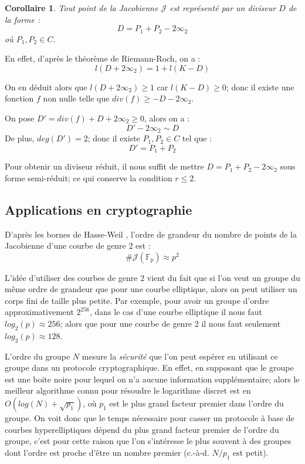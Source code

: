\documentclass[a4paper]{article}
\newtheorem{corollaire}[theoreme]{Corollaire}
\theoremstyle{definition}
\theoremstyle{remark}
\numberwithin{equation}{section}
\begin{document}
\begin{corollaire}
\label{div_red}
Tout point de la Jacobienne $\mathcal{J}$ est représenté par un diviseur $D$ de la forme :
$$D = P_1 + P_2 - 2\infty_2$$
où $P_1,P_2 \in C$.
\end{corollaire}

En effet, d'après le théorème de Riemann-Roch, on a :
$$l(D+2\infty_2) = 1 + l(K-D)$$

On en déduit alors que $l(D+2\infty_2) \geq 1$ car $l(K-D) \geq 0$; donc il existe une fonction $f$ non nulle telle que $div(f) \geq -D - 2\infty_2$.

On pose $D' = div(f) + D + 2\infty_2 \geq 0$, alors on a :
$$D' - 2\infty_2 \sim D$$
De plus, $deg(D') = 2$; donc il existe $P_1, P_2 \in C$ tel que :
$$D' = P_1 + P_2$$

Pour obtenir un diviseur réduit, il nous suffit de mettre $D = P_1 + P_2 - 2\infty_2$ sous forme semi-réduit; ce qui conserve la condition $r \leq 2$.

\subsection{Applications en cryptographie}
D'après les bornes de Hasse-Weil \citep{weil}, l'ordre de grandeur du nombre de points de la Jacobienne d'une courbe de genre 2 est :
$$\#\mathcal{J}(\mathbb{F}_p) \approx p^2$$

L'idée d'utiliser des courbes de genre $2$ vient du fait que si l'on veut un groupe du même ordre de grandeur que pour une courbe elliptique, alors on peut utiliser un corps fini de taille plus petite. Par exemple, pour avoir un groupe d'ordre approximativement $2^{256}$, dans le cas d'une courbe elliptique il nous faut $log_2(p) \approx 256$; alors que pour une courbe de genre 2 il nous faut seulement $log_2(p) \approx 128$.

L'ordre du groupe $N$ mesure la \emph{sécurité} que l'on peut espérer en utilisant ce groupe dans un protocole cryptographique. En effet, en supposant que le groupe est une boite noire pour lequel on n'a aucune information supplémentaire; alors le meilleur algorithme connu pour résoudre le logarithme discret est en $O(log(N)+\sqrt{p_1})$, où $p_1$ est le plus grand facteur premier dans l'ordre du groupe. On voit donc que le temps nécessaire pour casser un protocole à base de courbes hyperelliptiques dépend du plus grand facteur premier de l'ordre du groupe, c'est pour cette raison que l'on s'intéresse le plus souvent à des groupes dont l'ordre est proche d'être un nombre premier (c.-à-d. $N/p_1$ est petit).
 
\end{document}
